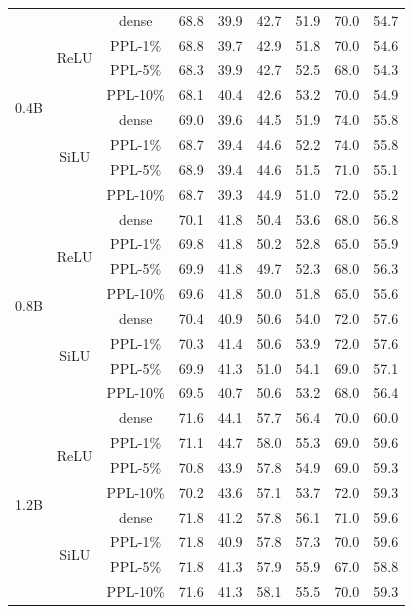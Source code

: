 \documentclass{article} %
\begin{document}
\begin{table}[ht]
\begin{center}
\begin{tabular}{c|c|c|cccccc}
\midrule
\multirow{8}{*}{0.4B} & \multirow{4}{*}{ReLU} 
& dense  & 68.8 & 39.9 & 42.7 & 51.9 & 70.0 & 54.7 \\
& & PPL-1\% & 68.8 & 39.7 & 42.9 & 51.8 & 70.0 & 54.6 \\
& & PPL-5\% & 68.3 & 39.9 & 42.7 & 52.5 & 68.0 & 54.3 \\
& & PPL-10\% & 68.1 & 40.4 & 42.6 & 53.2 & 70.0 & 54.9 \\
\cmidrule{2-9}
& \multirow{4}{*}{SiLU} 
& dense  & 69.0 & 39.6 & 44.5 & 51.9 & 74.0 & 55.8 \\
& & PPL-1\% & 68.7 & 39.4 & 44.6 & 52.2 & 74.0 & 55.8 \\
& & PPL-5\% & 68.9 & 39.4 & 44.6 & 51.5 & 71.0 & 55.1 \\
& & PPL-10\% & 68.7 & 39.3 & 44.9 & 51.0 & 72.0 & 55.2 \\

\midrule
\multirow{8}{*}{0.8B} & \multirow{4}{*}{ReLU} 
& dense  & 70.1 & 41.8 & 50.4 & 53.6 & 68.0 & 56.8 \\
& & PPL-1\% & 69.8 & 41.8 & 50.2 & 52.8 & 65.0 & 55.9 \\
& & PPL-5\% & 69.9 & 41.8 & 49.7 & 52.3 & 68.0 & 56.3 \\
& & PPL-10\% & 69.6 & 41.8 & 50.0 & 51.8 & 65.0 & 55.6 \\
\cmidrule{2-9}
& \multirow{4}{*}{SiLU} 
& dense  & 70.4 & 40.9 & 50.6 & 54.0 & 72.0 & 57.6 \\
& & PPL-1\% & 70.3 & 41.4 & 50.6 & 53.9 & 72.0 & 57.6 \\
& & PPL-5\% & 69.9 & 41.3 & 51.0 & 54.1 & 69.0 & 57.1 \\
& & PPL-10\% & 69.5 & 40.7 & 50.6 & 53.2 & 68.0 & 56.4 \\

\midrule
\multirow{8}{*}{1.2B} & \multirow{4}{*}{ReLU} 
& dense  & 71.6 & 44.1 & 57.7 & 56.4 & 70.0 & 60.0 \\
& & PPL-1\% & 71.1 & 44.7 & 58.0 & 55.3 & 69.0 & 59.6 \\
& & PPL-5\% & 70.8 & 43.9 & 57.8 & 54.9 & 69.0 & 59.3 \\
& & PPL-10\% & 70.2 & 43.6 & 57.1 & 53.7 & 72.0 & 59.3 \\
\cmidrule{2-9}
& \multirow{4}{*}{SiLU} 
& dense  & 71.8 & 41.2 & 57.8 & 56.1 & 71.0 & 59.6 \\
& & PPL-1\% & 71.8 & 40.9 & 57.8 & 57.3 & 70.0 & 59.6 \\
& & PPL-5\% & 71.8 & 41.3 & 57.9 & 55.9 & 67.0 & 58.8 \\
& & PPL-10\% & 71.6 & 41.3 & 58.1 & 55.5 & 70.0 & 59.3 \\
\bottomrule
\end{tabular}
\end{center}
\end{table}
\end{document}
